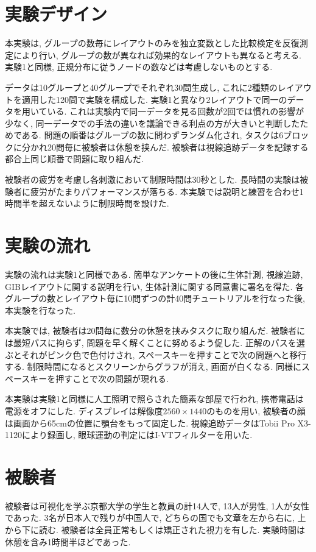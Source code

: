 \documentclass{kuee}
\begin{document}
\section{実験デザイン}
\label{sec:ex2-design}
本実験は, グループの数毎にレイアウトのみを独立変数とした比較検定を反復測定により行い, グループの数が異なれば効果的なレイアウトも異なると考える.
実験1と同様, 正規分布に従うノードの数などは考慮しないものとする.

データは10グループと40グループでそれぞれ30問生成し, これに2種類のレイアウトを適用した120問で実験を構成した.
実験1と異なり2レイアウトで同一のデータを用いている.
これは実験内で同一データを見る回数が2回では慣れの影響が少なく, 同一データでの手法の違いを議論できる利点の方が大きいと判断したためである.
問題の順番はグループの数に問わずランダム化され, タスクは6ブロックに分かれ20問毎に被験者は休憩を挟んだ.
被験者は視線追跡データを記録する都合上同じ順番で問題に取り組んだ.

被験者の疲労を考慮し各刺激において制限時間は30秒とした.
長時間の実験は被験者に疲労がたまりパフォーマンスが落ちる.
本実験では説明と練習を合わせ1時間半を超えないように制限時間を設けた.

\section{実験の流れ}
実験の流れは実験1と同様である.
簡単なアンケートの後に生体計測, 視線追跡, GIBレイアウトに関する説明を行い, 生体計測に関する同意書に署名を得た.
各グループの数とレイアウト毎に10問ずつの計40問チュートリアルを行なった後, 本実験を行なった.

本実験では, 被験者は20問毎に数分の休憩を挟みタスクに取り組んだ.
被験者には最短パスに拘らず, 問題を早く解くことに努めるよう促した.
正解のパスを選ぶとそれがピンク色で色付けされ, スペースキーを押すことで次の問題へと移行する.
制限時間になるとスクリーンからグラフが消え, 画面が白くなる.
同様にスペースキーを押すことで次の問題が現れる.

本実験は実験1と同様に人工照明で照らされた簡素な部屋で行われ, 携帯電話は電源をオフにした.
ディスプレイは解像度$2560 \times 1440$のものを用い, 被験者の顔は画面から65cmの位置に顎台をもって固定した.
視線追跡データはTobii Pro X3-1120により録画し, 眼球運動の判定にはI-VTフィルター\cite{olsen2012tobii}を用いた.

\section{被験者}
被験者は可視化を学ぶ京都大学の学生と教員の計14人で, 13人が男性, 1人が女性であった.
3名が日本人で残りが中国人で, どちらの国でも文章を左から右に, 上から下に読む.
被験者は全員正常もしくは矯正された視力を有した.
実験時間は休憩を含み1時間半ほどであった.
\end{document}
